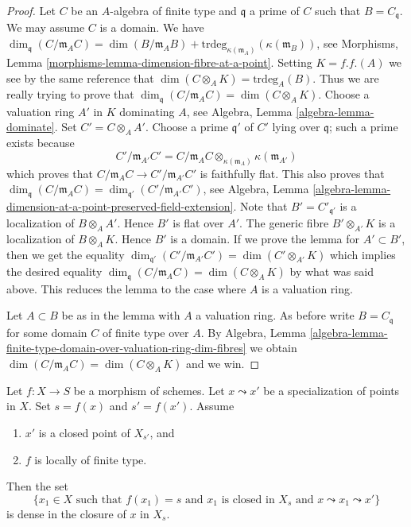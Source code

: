 \begin{proof}
Let $C$ be an $A$-algebra of finite type and $\mathfrak q$ a prime of $C$
such that $B = C_{\mathfrak q}$. We may assume $C$ is a domain.
We have
$\dim_{\mathfrak q}(C/\mathfrak m_AC) = \dim(B/\mathfrak m_AB) +
\text{trdeg}_{\kappa(\mathfrak m_A)}(\kappa(\mathfrak m_B))$, see
Morphisms, Lemma \ref{morphisms-lemma-dimension-fibre-at-a-point}.
Setting $K = f.f.(A)$ we see by the same reference that
$\dim(C \otimes_A K) = \text{trdeg}_A(B)$.
Thus we are really trying to prove that
$\dim_{\mathfrak q}(C/\mathfrak m_AC) = \dim(C \otimes_A K)$.
Choose a valuation ring $A'$ in $K$ dominating $A$, see
Algebra, Lemma \ref{algebra-lemma-dominate}.
Set $C' = C \otimes_A A'$.
Choose a prime $\mathfrak q'$ of $C'$ lying over $\mathfrak q$; such a
prime exists because
$$
C'/\mathfrak m_{A'}C' =
C/\mathfrak m_AC \otimes_{\kappa(\mathfrak m_A)} \kappa(\mathfrak m_{A'})
$$
which proves that $C/\mathfrak m_AC \to C'/\mathfrak m_{A'}C'$ is faithfully
flat. This also proves that
$\dim_{\mathfrak q}(C/\mathfrak m_AC) =
\dim_{\mathfrak q'}(C'/\mathfrak m_{A'}C')$, see
Algebra,
Lemma \ref{algebra-lemma-dimension-at-a-point-preserved-field-extension}.
Note that $B' = C'_{\mathfrak q'}$ is a localization of $B \otimes_A A'$.
Hence $B'$ is flat over $A'$. The generic fibre $B' \otimes_{A'} K$
is a localization of $B \otimes_A K$. Hence $B'$ is a domain.
If we prove the lemma for $A' \subset B'$, then we get the equality
$\dim_{\mathfrak q'}(C'/\mathfrak m_{A'}C') = \dim(C' \otimes_{A'} K)$
which implies the desired equality
$\dim_{\mathfrak q}(C/\mathfrak m_AC) = \dim(C \otimes_A K)$
by what was said above. This reduces the
lemma to the case where $A$ is a valuation ring.

\medskip\noindent
Let $A \subset B$ be as in the lemma with $A$ a valuation ring.
As before write $B = C_{\mathfrak q}$ for some domain $C$ of finite
type over $A$. By
Algebra,
Lemma \ref{algebra-lemma-finite-type-domain-over-valuation-ring-dim-fibres}
we obtain $\dim(C/\mathfrak m_AC) = \dim(C \otimes_A K)$ and we win.
\end{proof}

\begin{lemma}
\label{lemma-closed-point-nearby-fibre}
Let $f : X \to S$ be a morphism of schemes.
Let $x \leadsto x'$ be a specialization of points in $X$.
Set $s = f(x)$ and $s' = f(x')$.
Assume
\begin{enumerate}
\item $x'$ is a closed point of $X_{s'}$, and
\item $f$ is locally of finite type.
\end{enumerate}
Then the set
$$
\{x_1 \in X
\text{ such that }
f(x_1) = s
\text{ and }
x_1\text{ is closed in }X_s
\text{ and }
x \leadsto x_1 \leadsto x'
\}
$$
is dense in the closure of $x$ in $X_s$.
\end{lemma}

